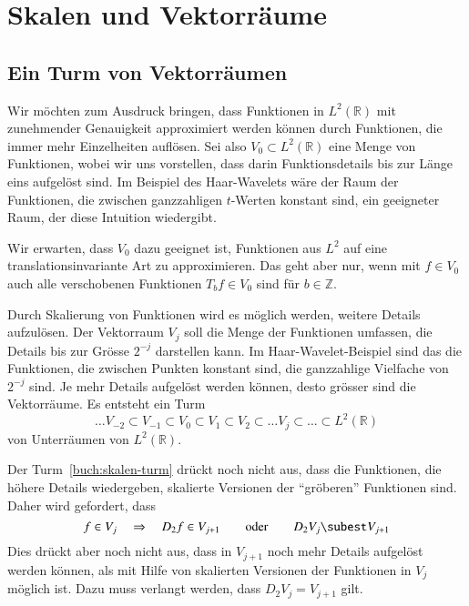 %
%
%
\section{Skalen und Vektorräume
\label{section:skalen und vektorraeume}}

\subsection{Ein Turm von Vektorräumen}
Wir möchten zum Ausdruck bringen, dass Funktionen in $L^2(\mathbb R)$
mit zunehmender Genauigkeit approximiert werden können durch Funktionen,
die immer mehr Einzelheiten auflösen.
Sei also $V_0\subset L^2(\mathbb R)$ eine Menge von Funktionen, wobei wir
uns vorstellen, dass darin Funktionsdetails bis zur Länge eins aufgelöst
sind.
Im Beispiel des Haar-Wavelets wäre der Raum der Funktionen, die
zwischen ganzzahligen $t$-Werten konstant sind, ein geeigneter Raum,
der diese Intuition wiedergibt.

Wir erwarten, dass $V_0$ dazu geeignet ist, Funktionen aus $L^2$ auf
eine translationsinvariante Art zu approximieren.
Das geht aber nur, wenn mit $f\in V_0$ auch alle verschobenen Funktionen
$T_bf\in V_0$ sind für $b\in\mathbb Z$.

Durch Skalierung von Funktionen wird es möglich werden, weitere Details
aufzulösen.
Der Vektorraum $V_j$ soll die Menge der Funktionen umfassen, die Details
bis zur Grösse $2^{-j}$ darstellen kann.
Im Haar-Wavelet-Beispiel sind das die Funktionen, die zwischen Punkten
konstant sind, die ganzzahlige Vielfache von $2^{-j}$ sind.
Je mehr Details aufgelöst werden können, desto grösser sind die
Vektorräume.
Es entsteht ein Turm
\begin{equation}
\dots
V_{-2}\subset
V_{-1}\subset
V_0\subset
V_1\subset
V_2\subset
\dots
V_j\subset
\dots
\subset L^2(\mathbb R)
\label{buch:skalen-turm}
\end{equation}
von Unterräumen von $L^2(\mathbb R)$.

Der Turm~\eqref{buch:skalen-turm} drückt noch nicht aus, dass die
Funktionen, die höhere Details wiedergeben, skalierte Versionen der
``gröberen'' Funktionen sind.
Daher wird gefordert, dass
\[
f\in V_j \quad\Rightarrow\quad D_2f\in V_{j+1}
\qquad\text{oder}\qquad
D_2V_j \subest V_{j+1}
\]
Dies drückt aber noch nicht aus, dass in $V_{j+1}$ noch mehr Details
aufgelöst werden können, als mit Hilfe von skalierten Versionen der
Funktionen in $V_j$ möglich ist.
Dazu muss verlangt werden, dass
$D_2V_j = V_{j+1}$
gilt.

